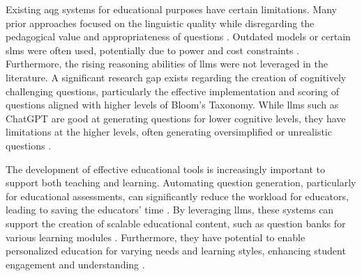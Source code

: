 \hspace{1.5em} Existing \ac{aqg} systems for educational purposes have certain limitations. Many prior approaches focused on the linguistic quality while disregarding the pedagogical value and appropriateness of questions \cite{horbach_linguistic_2020,steuer_i_2021}. Outdated models \cite{cheng_treequestion_2024,elkins_how_2023,bhowmick_automating_2023} or certain \ac{slms} \cite{luo_systematic_2023} were often used, potentially due to power and cost constraints \cite{zhuge_twinstar_2025,vu_chatgpt-based_2024}. Furthermore, the rising reasoning abilities of \ac{llms} were not leveraged in the literature. 
A significant research gap exists regarding the creation of cognitively challenging questions, particularly the effective implementation and scoring of questions aligned with higher levels of Bloom's Taxonomy. While \ac{llms} such as ChatGPT \cite{openai_introducing_2022} are good at generating questions for lower cognitive levels, they have limitations at the higher levels, often generating oversimplified or unrealistic questions \cite{duong-trung_bloomllm_2024,elkins_how_2023,scaria_automated_2024}. 


 The development of effective educational tools is increasingly important to support both teaching and learning. Automating question generation, particularly for educational assessments, can significantly reduce the workload for educators, leading to saving the educators' time \cite{biancini_multiple-choice_2024,hang_mcqgen_2024,vu_chatgpt-based_2024,cheng_treequestion_2024}. By leveraging \ac{llms}, these systems can support the creation of scalable educational content, such as question banks for various learning modules \cite{vu_chatgpt-based_2024}. Furthermore, they have potential to enable personalized education for varying needs and learning styles, enhancing student engagement and understanding \cite{hang_mcqgen_2024}.

